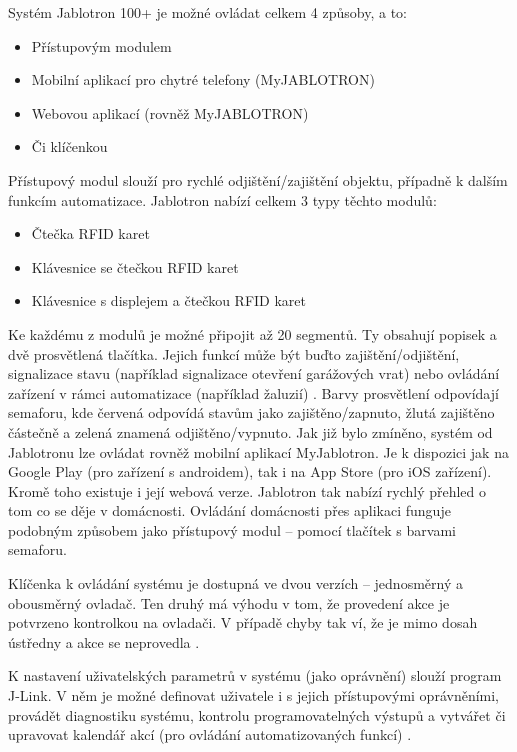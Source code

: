 Systém Jablotron 100+ je možné ovládat celkem 4 způsoby, a to:
\begin{itemize}
    \item Přístupovým modulem
    \item Mobilní aplikací pro chytré telefony (MyJABLOTRON)
    \item Webovou aplikací (rovněž MyJABLOTRON)
    \item Či klíčenkou \cite{JablotronVasDum}
\end{itemize}

Přístupový modul slouží pro rychlé odjištění/zajištění objektu, případně k dalším funkcím automatizace. Jablotron nabízí celkem 3 typy těchto modulů:

\begin{itemize}
    \item Čtečka RFID karet
    \item Klávesnice se čtečkou RFID karet
    \item Klávesnice s displejem a čtečkou RFID karet
\end{itemize}

Ke každému z modulů je možné připojit až 20 segmentů. Ty obsahují popisek a dvě prosvětlená tlačítka. Jejich funkcí může být buďto zajištění/odjištění, signalizace stavu (například signalizace otevření garážových vrat) nebo ovládání zařízení v rámci automatizace (například žaluzií) \cite{J100Manual}. Barvy prosvětlení odpovídají semaforu, kde červená odpovídá stavům jako zajištěno/zapnuto, žlutá zajištěno částečně a zelená znamená odjištěno/vypnuto. \newline
Jak již bylo zmíněno, systém od Jablotronu lze ovládat rovněž mobilní aplikací MyJablotron. Je k dispozici jak na Google Play (pro zařízení s androidem), tak i na App Store (pro iOS zařízení). Kromě toho existuje i její webová verze. Jablotron tak nabízí rychlý přehled o tom co se děje v domácnosti. Ovládání domácnosti přes aplikaci funguje podobným způsobem jako přístupový modul – pomocí tlačítek s barvami semaforu.

Klíčenka k ovládání systému je dostupná ve dvou verzích – jednosměrný a obousměrný ovladač. Ten druhý má výhodu v tom, že provedení akce je potvrzeno kontrolkou na ovladači. V případě chyby tak ví, že je mimo dosah ústředny a akce se neprovedla \cite{J100Manual}.

K nastavení uživatelských parametrů v systému (jako oprávnění) slouží program J-Link. V něm je možné definovat uživatele i s jejich přístupovými oprávněními, provádět diagnostiku systému, kontrolu programovatelných výstupů a vytvářet či upravovat kalendář akcí (pro ovládání automatizovaných funkcí) \cite{JLinkManual}.

